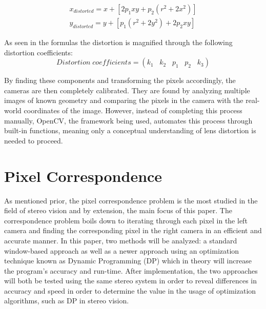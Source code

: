 \documentclass[11pt]{scrartcl}
\begin{document}
\begin{theorem}
	\begin{align}
		x_{distorted} = x + [ 2p_1xy + p_2(r^2+2x^2)] 
		                                              \\ y_{distorted} = y + [ p_1(r^2+ 2y^2)+ 2p_2xy]
	\end{align}
	    
\end{theorem}

As seen in the formulas the distortion is magnified through the following distortion coefficients: 
\begin{displaymath}
	Distortion \; coefficients=(k_1 \hspace{10pt} k_2 \hspace{10pt} p_1 \hspace{10pt} p_2 \hspace{10pt} k_3)
\end{displaymath}

By finding these components and transforming the pixels accordingly, the cameras are then completely calibrated. They are found by analyzing multiple images of known geometry and comparing the pixels in the camera with the real-world coordinates of the image. However, 
instead of completing this process manually, OpenCV, the framework being used, automates this process through built-in functions, meaning only a conceptual understanding of lens distortion is needed to proceed. 

\section{Pixel Correspondence}

As mentioned prior, the pixel correspondence problem is the most studied in the field of stereo vision and by extension, the main focus of this paper. The correspondence problem boils down to iterating through each pixel in the left camera and finding the corresponding pixel in the right camera in an efficient and accurate manner. In this paper, 
two methods will be analyzed: a standard window-based approach as well as a newer approach using an optimization technique known as Dynamic Programming (DP) which in theory will increase the program's accuracy and run-time. After implementation, the two approaches will both be tested using the same stereo system in order to reveal differences in accuracy and speed in order to determine the value in the usage of optimization algorithms, such as DP in stereo vision. 
\end{document}
